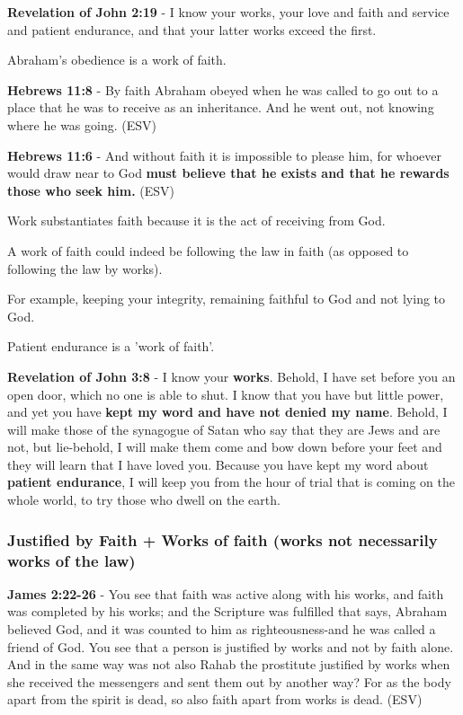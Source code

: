 \documentclass[11pt]{article}
\begin{document}
\textbf{Revelation of John 2:19} - I know your works, your love and faith and service and patient endurance, and that your latter works exceed the first.

Abraham's obedience is a work of faith.

\textbf{Hebrews 11:8} - By faith Abraham obeyed when he was called to go out to a place that he was to receive as an inheritance. And he went out, not knowing where he was going. (ESV)

\textbf{Hebrews 11:6} - And without faith it is impossible to please him, for whoever would draw near to God \textbf{must believe that he exists and that he rewards those who seek him.} (ESV)

Work substantiates faith because it is the act of receiving from God.

A work of faith could indeed be following the law in faith (as opposed to following the law by works).

For example, keeping your integrity, remaining faithful to God and not lying to God.

Patient endurance is a 'work of faith'.

\textbf{Revelation of John 3:8} - I know your \textbf{works}. Behold, I have set before you an open door, which no one is able to shut. I know that you have but little power, and yet you have \textbf{kept my word and have not denied my name}. Behold, I will make those of the synagogue of Satan who say that they are Jews and are not, but lie-behold, I will make them come and bow down before your feet and they will learn that I have loved you. Because you have kept my word about \textbf{patient endurance}, I will keep you from the hour of trial that is coming on the whole world, to try those who dwell on the earth.

\subsubsection{Justified by Faith + Works of faith (works not necessarily works of the law)}
\label{sec:org559e22b}
\textbf{James 2:22-26} - You see that faith was active along with his works, and faith was completed by his works; and the Scripture was fulfilled that says, Abraham believed God, and it was counted to him as righteousness-and he was called a friend of God. You see that a person is justified by works and not by faith alone. And in the same way was not also Rahab the prostitute justified by works when she received the messengers and sent them out by another way? For as the body apart from the spirit is dead, so also faith apart from works is dead. (ESV)
\end{document}
